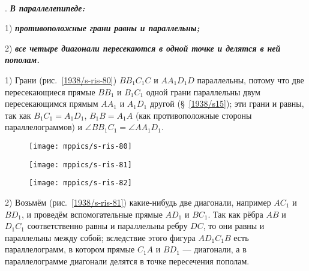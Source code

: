 \paragraph{}\label{1938/s72}
\mbox{.}
\textbf{\emph{В параллелепипеде:}}

1) \textbf{\emph{противоположные грани равны и параллельны;}}

2) \textbf{\emph{все четыре диагонали пересекаются в одной точке и делятся в ней пополам.}}

1) Грани (рис.~\ref{1938/s-ris-80}) $BB_1C_1C$ и $AA_1D_1D$ параллельны, потому что две пересекающиеся прямые $BB_1$ и $B_1C_1$ одной грани параллельны двум пересекающимся прямым $AA_1$ и $A_1D_1$ другой (§~\ref{1938/s15});
эти грани и равны, так как $B_1C_1=A_1D_1$, $B_1B=A_1A$ (как противоположные стороны параллелограммов) и $\angle BB_1C_1=\angle AA_1D_1$.

\begin{figure}[!ht]
\begin{minipage}{.32\textwidth}
\centering
\texttt{[image: mppics/s-ris-80]}
\end{minipage}\hfill
\begin{minipage}{.32\textwidth}
\centering
\texttt{[image: mppics/s-ris-81]}
\end{minipage}\hfill
\begin{minipage}{.32\textwidth}
\centering
\texttt{[image: mppics/s-ris-82]}
\end{minipage}

\medskip

\begin{minipage}{.32\textwidth}
\centering
\caption{}\label{1938/s-ris-80}
\end{minipage}\hfill
\begin{minipage}{.32\textwidth}
\centering
\caption{}\label{1938/s-ris-81}
\end{minipage}\hfill
\begin{minipage}{.32\textwidth}
\centering
\caption{}\label{1938/s-ris-82}
\end{minipage}
\vskip-4mm
\end{figure} 

2) Возьмём (рис.~\ref{1938/s-ris-81}) какие-нибудь две диагонали, например $AC_1$ и $BD_1$, и проведём вспомогательные прямые $AD_1$ и $BC_1$.
Так как рёбра $AB$ и $D_1C_1$ соответственно равны и параллельны ребру $DC$, то они равны и параллельны между собой;
вследствие этого фигура $AD_1C_1B$ есть параллелограмм, в котором прямые $C_1A$ и $BD_1$ — диагонали, а в параллелограмме диагонали делятся в точке пересечения пополам.

